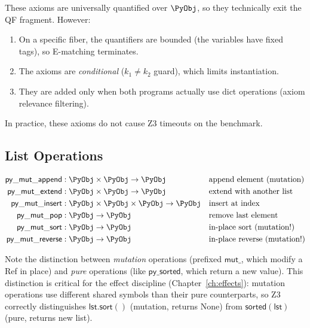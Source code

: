 \begin{proposition}
These axioms are universally quantified over $\PyObj$, so they
technically exit the QF fragment.  However:
\begin{enumerate}
  \item On a specific fiber, the quantifiers are bounded (the
    variables have fixed tags), so E-matching terminates.
  \item The axioms are \emph{conditional} ($k_1 \neq k_2$ guard),
    which limits instantiation.
  \item They are added only when both programs actually use dict
    operations (axiom relevance filtering).
\end{enumerate}
In practice, these axioms do not cause Z3 timeouts on the benchmark.
\end{proposition}

\subsection{List Operations}

\begin{definition}
\begin{align}
  \mathsf{py\_mut\_append} &: \PyObj \times \PyObj \to \PyObj
    && \text{append element (mutation)} \\
  \mathsf{py\_mut\_extend} &: \PyObj \times \PyObj \to \PyObj
    && \text{extend with another list} \\
  \mathsf{py\_mut\_insert} &: \PyObj \times \PyObj \times \PyObj
    \to \PyObj
    && \text{insert at index} \\
  \mathsf{py\_mut\_pop} &: \PyObj \to \PyObj
    && \text{remove last element} \\
  \mathsf{py\_mut\_sort} &: \PyObj \to \PyObj
    && \text{in-place sort (mutation!)} \\
  \mathsf{py\_mut\_reverse} &: \PyObj \to \PyObj
    && \text{in-place reverse (mutation!)}
\end{align}
\end{definition}

Note the distinction between \emph{mutation} operations (prefixed
$\mathsf{mut\_}$, which modify a Ref in place) and \emph{pure}
operations (like $\mathsf{py\_sorted}$, which return a new value).
This distinction is critical for the effect discipline
(Chapter~\ref{ch:effects}): mutation operations use different shared
symbols than their pure counterparts, so Z3 correctly distinguishes
$\mathsf{lst.sort()}$ (mutation, returns None) from
$\mathsf{sorted(lst)}$ (pure, returns new list).


